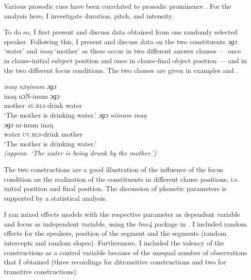 Various prosodic cues have been correlated to prosodic prominence \citep[see among others][]{baumann2006prosodic, Maskikit_Essed_2016, Lee_2015, Arnhold2017Model}. For the analysis here, I investigate duration, pitch, and intensity. 


To do so, I first present and discuss data obtained from one randomly selected speaker. Following this, I present and discuss data on the two constituents \textit{ɔɡɔ} ‘water’ and \textit{inaŋ} ‘mother’ as these occur in two different answer clauses --- once in clause-initial subject position and once in clause-final object position --- and in the two different focus conditions.  The two clauses  are given in examples   and .


\ea
\label{ex:Inang nonginum ɔɡɔ}
\textit{inaŋ nɔŋinum ɔɡɔ} \\
\gll   inaŋ nɔN-inum ɔɡɔ\\
mother \textsc{av.rls-}drink water\\
\glt `The mother is drinking water.' 
\ex
\label{ex:ɔɡɔ niinum inang}
\textit{ɔɡɔ ni​inum inaŋ} \\
\gll   ɔɡɔ ni-inum inaŋ\\
water \textsc{uv.rls-}drink mother\\
\glt `The mother is drinking water.' \\ \textit{(approx. `The water is being drunk by the mother.')}
\z



The two constructions are a good illustration of the influence of the focus condition on the realization of the constituents in different clause positions, i.e. initial position and final position. The discussion of phonetic parameters is supported by a statistical analysis.

I ran mixed effects models  with the respective parameter as dependent variable and focus as independent variable, using the  \textit{lme4}  package \citep{lme4}  in  \citep{R_manual}. I included random effects for the speakers, position of the segment and the segments (random intercepts and random slopes). Furthermore, I included the valency of the constructions as a control variable because of the unequal number of observations that I obtained (three recordings for ditransitive constructions and two for transitive constructions).





